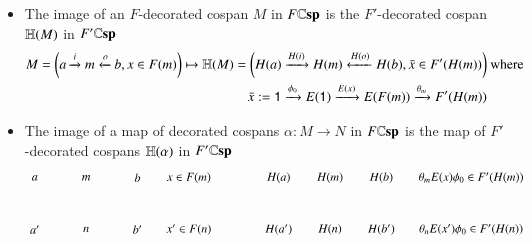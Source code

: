 \documentclass[reqno]{amsart}
\begin{document}
\begin{itemize}
\item The image of an $F$-decorated cospan $M$ in $F\mathbf{\mathbb Csp}$ is the $F'$-decorated cospan $\mathbf{\mathbb H}(M)$ in $F'\mathbf{\mathbb Csp}$
\begin{align*}
 M=\left(a\xrightarrow{i}m\xleftarrow{o}b,x\in F(m)\right)\mapsto \mathbf{\mathbb H}(M)=\left(H(a)\xrightarrow{H(i)}H(m)\xleftarrow{H(o)}H(b),\bar{x}\in F'(H(m))\right)& \textrm{ where } \\
\bar{x}:=\mathsf{1} \xrightarrow{\phi_0} E(\mathsf{1}) \xrightarrow{E(x)} E(F(m)) \xrightarrow{\theta_m} F'(H(m)) &
\end{align*}
\item The image of a map of decorated cospans $\alpha \colon M \to N$ in $F\mathbf{\mathbb Csp}$ is the map of $F'$-decorated cospans $\mathbf{\mathbb H}(\alpha)$ in $F'\mathbf{\mathbb Csp}$
\[
\begin{tikzpicture}[scale=1.5]
\node (A) at (0,0.5) {$a$};
\node (A') at (0,-0.5) {$a'$};
\node (B) at (1,0.5) {$m$};
\node (C) at (2,0.5) {$b$};
\node (C') at (2,-0.5) {$b'$};
\node (D) at (1,-0.5) {$n$};
\node (E) at (3,0.5) {$x \in F(m)$};
\node (F) at (3,-0.5) {$x' \in F(n)$};
\node (A'') at (4.75,0.5) {$H(a)$};
\node (A''') at (4.75,-0.5) {$H(a')$};
\node (B'') at (5.75,0.5) {$H(m)$};
\node (C'') at (6.75,0.5) {$H(b)$};
\node (C''') at (6.75,-0.5) {$H(b')$};
\node (D'') at (5.75,-0.5) {$H(n)$};
\node (E'') at (8.5,0.5) {$\theta_m E(x) \phi_0 \in F'(H(m))$};
\node (F'') at (8.5,-0.5) {$\theta_n E(x') \phi_0 \in F'(H(n))$};

\end{tikzpicture}\]
\end{itemize}
\end{document}

